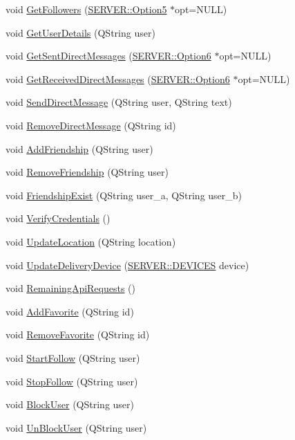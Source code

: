 \begin{CompactItemize}
\item 
void \hyperlink{classCore_635c5c7bb0b6d2c2c6250ac050b466d6}{GetFollowers} (\hyperlink{structSERVER_1_1Option5}{SERVER::Option5} $\ast$opt=NULL)
\item 
void \hyperlink{classCore_572cef51b68ea351bdda246b5070c399}{GetUserDetails} (QString user)
\item 
void \hyperlink{classCore_1b43e65adc3ba72ae2bb344bec27eb53}{GetSentDirectMessages} (\hyperlink{structSERVER_1_1Option6}{SERVER::Option6} $\ast$opt=NULL)
\item 
void \hyperlink{classCore_5496ee42ce9d32aa0f98a2d56e3bbddf}{GetReceivedDirectMessages} (\hyperlink{structSERVER_1_1Option6}{SERVER::Option6} $\ast$opt=NULL)
\item 
void \hyperlink{classCore_f6afb71b9114a90e9b9856f64a6fe9cf}{SendDirectMessage} (QString user, QString text)
\item 
void \hyperlink{classCore_d98d496c44ebff775698737f8edbde44}{RemoveDirectMessage} (QString id)
\item 
void \hyperlink{classCore_3df3b62fa5366492a3eb4bba99f1849a}{AddFriendship} (QString user)
\item 
void \hyperlink{classCore_95ce85046d01f3d5d6928f06e8aab99c}{RemoveFriendship} (QString user)
\item 
void \hyperlink{classCore_0430da6765198a4f763ea7528f8e1e86}{FriendshipExist} (QString user\_\-a, QString user\_\-b)
\item 
void \hyperlink{classCore_e7b7355b923afe51411e3c949679904d}{VerifyCredentials} ()
\item 
void \hyperlink{classCore_62635d6cffb1fbef9f5c650518f83c67}{UpdateLocation} (QString location)
\item 
void \hyperlink{classCore_291a15a3ec5ebadc314c991f74cde776}{UpdateDeliveryDevice} (\hyperlink{namespaceSERVER_354160f0b752453a760c63ec882c8c87}{SERVER::DEVICES} device)
\item 
void \hyperlink{classCore_0cf4c10e33b1158e651977210312ea13}{RemainingApiRequests} ()
\item 
void \hyperlink{classCore_dbeb18bcc46253950b7660582d2eb5f5}{AddFavorite} (QString id)
\item 
void \hyperlink{classCore_c12e1d495cfea0a38c4adb38f258d27c}{RemoveFavorite} (QString id)
\item 
void \hyperlink{classCore_5cd0ceaff4b8d19b40f9b2e00839a286}{StartFollow} (QString user)
\item 
void \hyperlink{classCore_9a55db5cfe7788972b20d6a6bdc91218}{StopFollow} (QString user)
\item 
void \hyperlink{classCore_e715888efd76cc27271e4050ebed4c0b}{BlockUser} (QString user)
\item 
void \hyperlink{classCore_abc783553ec1e543435b8dc06f64939f}{UnBlockUser} (QString user)
\end{CompactItemize}


